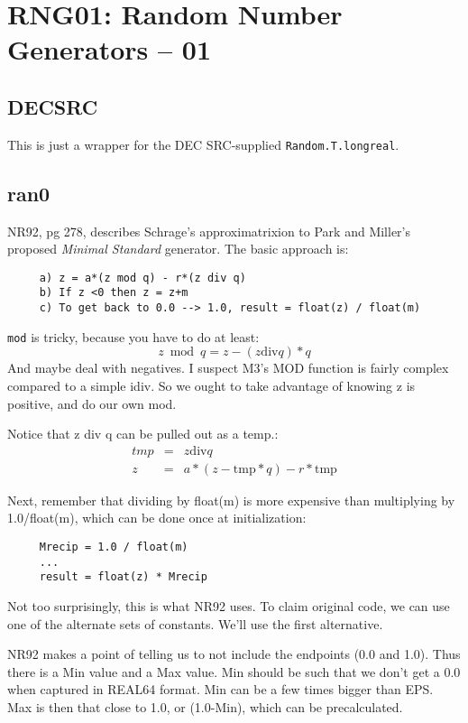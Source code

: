 \section{RNG01: Random Number Generators -- 01}

\subsection*{DECSRC}
This is just a wrapper for the DEC SRC-supplied {\tt Random.T.longreal}.

\subsection*{ran0}
NR92, pg 278, describes Schrage's approximatrixion to Park and Miller's
proposed {\em Minimal Standard} generator. The basic approach is:
\begin{verbatim}
     a) z = a*(z mod q) - r*(z div q)
     b) If z <0 then z = z+m
     c) To get back to 0.0 --> 1.0, result = float(z) / float(m)
\end{verbatim}
     
{\tt mod} is tricky, because you have to do at least:
\begin{equation}
  z \bmod q = z - (z \mbox{div} q)*q
\end{equation}
And maybe deal with negatives.  I suspect M3's MOD function
is fairly complex compared to a simple idiv.  So we ought to
take advantage of knowing z is positive, and do our own mod.

Notice that z div q can be pulled out as a temp.:
\begin{eqnarray}
     tmp & = & z \mbox{div} q\\
     z & = & a*(z - \mbox{tmp}*q) - r*\mbox{tmp}
\end{eqnarray}

Next, remember that dividing by float(m) is more expensive than
multiplying by 1.0/float(m), which can be done once at
initialization:
\begin{verbatim}
     Mrecip = 1.0 / float(m)
     ...
     result = float(z) * Mrecip
\end{verbatim}
     
Not too surprisingly, this is what NR92 uses.  To claim original
code, we can use one of the alternate sets of constants.
We'll use the first alternative.

NR92 makes a point of telling us to not include the
endpoints (0.0 and 1.0).  Thus there is a Min value and a
Max value.  Min should be such that we don't get a 0.0 when
captured in REAL64 format.  Min can be a few times bigger than EPS.
Max is then that close to 1.0, or (1.0-Min), which can be precalculated.

